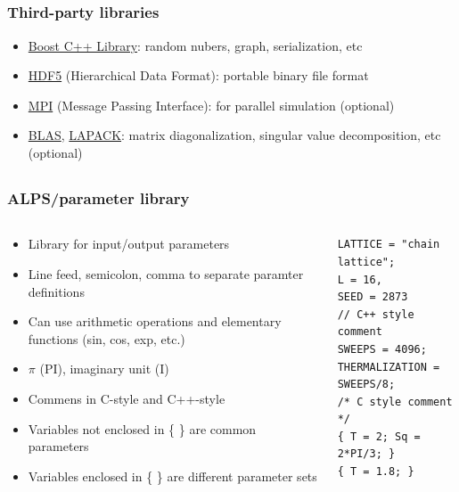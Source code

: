 \subsection*{\redm\whitem\greenb}
\begin{frame}[t,fragile]
  \frametitle{Third-party libraries}
  \begin{itemize}
    \setlength{\itemsep}{1em}
  \item \href{http://www.boost.org/}{Boost C++ Library}: random nubers, graph, serialization, etc
  \item \href{http://www.hdfgroup.org/HDF5/}{HDF5} (Hierarchical Data Format): portable binary file format
  \item \href{http://www.mpi-forum.org/}{MPI} (Message Passing Interface): for parallel simulation (optional)
  \item \href{http://www.netlib.org/blas/}{BLAS}, \href{http://www.netlib.org/lapack/}{LAPACK}: matrix diagonalization, singular value decomposition, etc (optional)
  \end{itemize}
\end{frame}

\subsection*{\redm\whitem\greenb}
\begin{frame}[t,fragile]
  \frametitle{ALPS/parameter library}
  \begin{columns}[T]
    \begin{column}{.5\textwidth}
      \begin{itemize}
      \item Library for input/output parameters
        \item Line feed, semicolon, comma to separate paramter definitions
        \item Can use arithmetic operations and elementary functions (sin, cos, exp, etc.)
        \item $\pi$ (PI), imaginary unit (I)
          \item Commens in C-style and C++-style
          \item Variables not enclosed in \{ \} are common parameters
          \item Variables enclosed in \{ \} are different parameter sets
      \end{itemize}
    \end{column}
    \begin{column}{.5\textwidth}
    \begin{lstlisting}
LATTICE = "chain lattice";
L = 16,
SEED = 2873
// C++ style comment
SWEEPS = 4096;
THERMALIZATION = SWEEPS/8;
/* C style comment */
{ T = 2; Sq = 2*PI/3; }
{ T = 1.8; }
\end{lstlisting}
    \end{column}
  \end{columns}
\end{frame}

